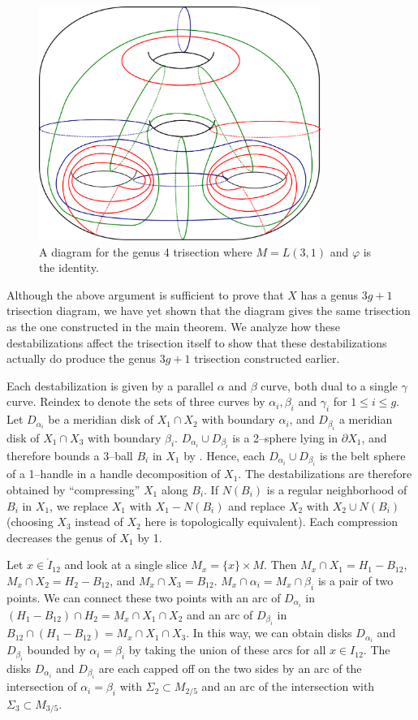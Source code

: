 \documentclass[12pt]{amsart}
\newcommand{\del}{\partial }
\theoremstyle{definition}
\theoremstyle{remark}
\begin{document}
\begin{figure}[h]
\centering
\includegraphics[height=3in]{LxS12destab.png}
\caption{A diagram for the genus 4 trisection where $M = L(3,1)$ and $\varphi$ is the identity.
}
\label{ls12destab}
\end{figure}

Although the above argument is sufficient to prove that $X$ has a genus $3g+1$ trisection diagram, we have yet shown that the diagram gives the same trisection as the one constructed in the main theorem.
We analyze how these destabilizations affect the trisection itself to show that these destabilizations actually do produce the genus $3g+1$ trisection constructed earlier.


Each destabilization is given by a parallel $\alpha$ and $\beta$ curve, both dual to a single $\gamma$ curve.
Reindex to denote the sets of three curves by $\alpha_i,\beta_i$ and $\gamma_i$ for $1 \le i \le g$.
Let $D_{\alpha_i}$ be a meridian disk of $X_1 \cap X_2$ with boundary $\alpha_i$, and $D_{\beta_i}$ a meridian disk of $X_1 \cap X_3$ with boundary $\beta_i$.
$D_{\alpha_i} \cup D_{\beta_i}$ is a 2--sphere lying in $\del X_1$, and therefore bounds a 3--ball $B_i$ in $X_1$ by \cite{LaudenbachPoenaru1}.
Hence, each $D_{\alpha_i} \cup D_{\beta_i}$ is the belt sphere of a 1--handle in a handle decomposition of $X_1$.
The destabilizations are therefore obtained by ``compressing'' $X_1$ along $B_i$.
If $N(B_i)$ is a regular neighborhood of $B_i$ in $X_1$, we replace $X_1$ with $X_1 - N(B_i)$ and replace $X_2$ with $X_2 \cup N(B_i)$ (choosing $X_3$ instead of $X_2$ here is topologically equivalent).
Each compression decreases the genus of $X_1$ by 1.

Let $x \in \mathring I_{12}$ and look at a single slice $M_x = \{x\} \times M$.
Then $M_x \cap X_1 = H_1 - B_{12}$, $M_x \cap X_2 = H_2 - B_{12}$, and $M_x \cap X_3 = B_{12}$.
$M_x \cap \alpha_i = M_x \cap \beta_i$ is a pair of two points.
We can connect these two points with an arc of $D_{\alpha_i}$ in $(H_1 - B_{12}) \cap H_2 = M_x \cap X_1 \cap X_2$ and an arc of $D_{\beta_i}$ in $B_{12} \cap (H_1 - B_{12}) = M_x \cap X_1 \cap X_3$.
In this way, we can obtain disks $D_{\alpha_i}$ and $D_{\beta_i}$ bounded by $\alpha_i = \beta_i$ by taking the union of these arcs for all $x \in I_{12}$.
The disks $D_{\alpha_i}$ and $D_{\beta_i}$ are each capped off on the two sides by an arc of the intersection of $\alpha_i = \beta_i$ with $\Sigma_2 \subset M_{2/5}$ and an arc of the intersection with $\Sigma_3 \subset M_{3/5}$.
\end{document}
